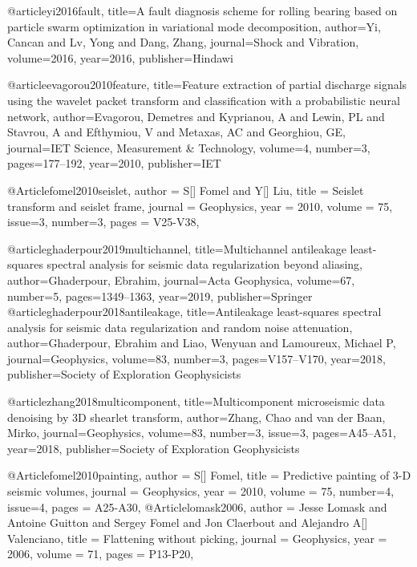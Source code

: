 @article{yi2016fault,
  title={A fault diagnosis scheme for rolling bearing based on particle swarm optimization in variational mode decomposition},
  author={Yi, Cancan and Lv, Yong and Dang, Zhang},
  journal={Shock and Vibration},
  volume={2016},
  year={2016},
  publisher={Hindawi}
}

@article{evagorou2010feature,
  title={Feature extraction of partial discharge signals using the wavelet packet transform and classification with a probabilistic neural network},
  author={Evagorou, Demetres and Kyprianou, A and Lewin, PL and Stavrou, A and Efthymiou, V and Metaxas, AC and Georghiou, GE},
  journal={IET Science, Measurement \& Technology},
  volume={4},
  number={3},
  pages={177--192},
  year={2010},
  publisher={IET}
}

@Article{fomel2010seislet,
  author = 	 {S[] Fomel and Y[] Liu},
  title = 	 {Seislet transform and seislet frame},
  journal = 	 {Geophysics},
  year = 	 2010,
  volume =	 75,
  issue=3,
  number=3,
  pages =	 {V25-V38},
}

@article{ghaderpour2019multichannel,
  title={Multichannel antileakage least-squares spectral analysis for seismic data regularization beyond aliasing},
  author={Ghaderpour, Ebrahim},
  journal={Acta Geophysica},
  volume={67},
  number={5},
  pages={1349--1363},
  year={2019},
  publisher={Springer}
}
@article{ghaderpour2018antileakage,
  title={Antileakage least-squares spectral analysis for seismic data regularization and random noise attenuation},
  author={Ghaderpour, Ebrahim and Liao, Wenyuan and Lamoureux, Michael P},
  journal={Geophysics},
  volume={83},
  number={3},
  pages={V157--V170},
  year={2018},
  publisher={Society of Exploration Geophysicists}
}

@article{zhang2018multicomponent,
  title={Multicomponent microseismic data denoising by 3{D} shearlet transform},
  author={Zhang, Chao and van der Baan, Mirko},
  journal={Geophysics},
  volume={83},
  number={3},
  issue=3,
  pages={A45--A51},
  year={2018},
  publisher={Society of Exploration Geophysicists}
}

@Article{fomel2010painting,
  author = 	 {S[] Fomel},
  title = 	 {Predictive painting of 3-{D} seismic volumes},
  journal = 	 {Geophysics},
  year = 	 2010,
  volume =	 75,
  number=4,
  issue=4,
  pages =	 {A25-A30},
}
@Article{lomask2006,
  author = 	 {Jesse Lomask and Antoine Guitton and Sergey Fomel and Jon Claerbout and Alejandro A[] Valenciano},
  title = 	 {Flattening without picking},
  journal = 	 {Geophysics},
  year = 	 2006,
  volume =	 71,
  pages =	 {P13-P20},
}

